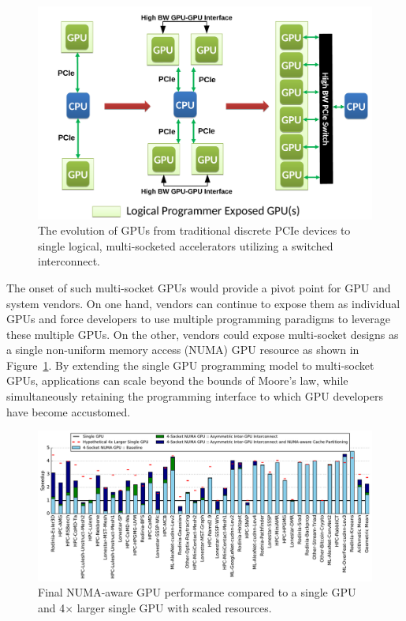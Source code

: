 \documentclass{sig-alternate}
\begin{document}
\begin{figure}[t]
	\centering
	\includegraphics[width=1.0\columnwidth]{figures/inter_gpu_connections.pdf}
	\caption{The evolution of GPUs from traditional discrete PCIe devices to 
		single logical, multi-socketed accelerators utilizing a switched interconnect.}
	\vspace{-0.5cm}
	\label{fig:systemdiagram}
\end{figure}

The onset of such multi-socket GPUs would provide a pivot point for GPU and system vendors. On one hand, vendors can continue to expose them as 
individual GPUs and force developers to use multiple programming paradigms to 
leverage these multiple GPUs. On the other, vendors could expose multi-socket 
designs as a single non-uniform memory access (NUMA) GPU resource as shown in Figure~\ref{fig:systemdiagram}.  
By extending the single GPU programming model to multi-socket GPUs,  applications 
can scale beyond the bounds of Moore's law, while simultaneously retaining the 
programming interface to which GPU developers have become accustomed.

\begin{figure}[!t]
	\centering
	\includegraphics[width=1.0\textwidth]{figures/plot_final_speedup_WB_nvlink_first.pdf}
	\caption{Final NUMA-aware GPU performance compared to a single GPU and 4$\times$ larger single GPU with scaled resources.}
	\label{fig:combined}
\end{figure}
\end{document}
